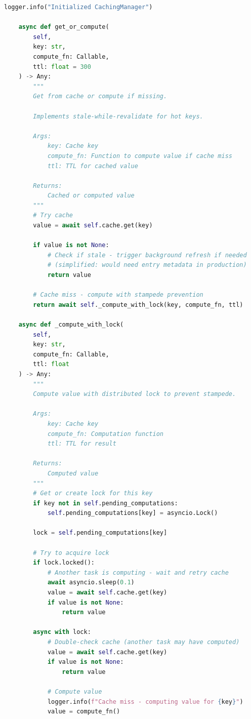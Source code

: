 \begin{lstlisting}[language=Python, caption={Intelligent Caching System}]
        logger.info("Initialized CachingManager")

    async def get_or_compute(
        self,
        key: str,
        compute_fn: Callable,
        ttl: float = 300
    ) -> Any:
        """
        Get from cache or compute if missing.

        Implements stale-while-revalidate for hot keys.

        Args:
            key: Cache key
            compute_fn: Function to compute value if cache miss
            ttl: TTL for cached value

        Returns:
            Cached or computed value
        """
        # Try cache
        value = await self.cache.get(key)

        if value is not None:
            # Check if stale - trigger background refresh if needed
            # (simplified: would need entry metadata in production)
            return value

        # Cache miss - compute with stampede prevention
        return await self._compute_with_lock(key, compute_fn, ttl)

    async def _compute_with_lock(
        self,
        key: str,
        compute_fn: Callable,
        ttl: float
    ) -> Any:
        """
        Compute value with distributed lock to prevent stampede.

        Args:
            key: Cache key
            compute_fn: Computation function
            ttl: TTL for result

        Returns:
            Computed value
        """
        # Get or create lock for this key
        if key not in self.pending_computations:
            self.pending_computations[key] = asyncio.Lock()

        lock = self.pending_computations[key]

        # Try to acquire lock
        if lock.locked():
            # Another task is computing - wait and retry cache
            await asyncio.sleep(0.1)
            value = await self.cache.get(key)
            if value is not None:
                return value

        async with lock:
            # Double-check cache (another task may have computed)
            value = await self.cache.get(key)
            if value is not None:
                return value

            # Compute value
            logger.info(f"Cache miss - computing value for {key}")
            value = compute_fn()


\end{lstlisting}
